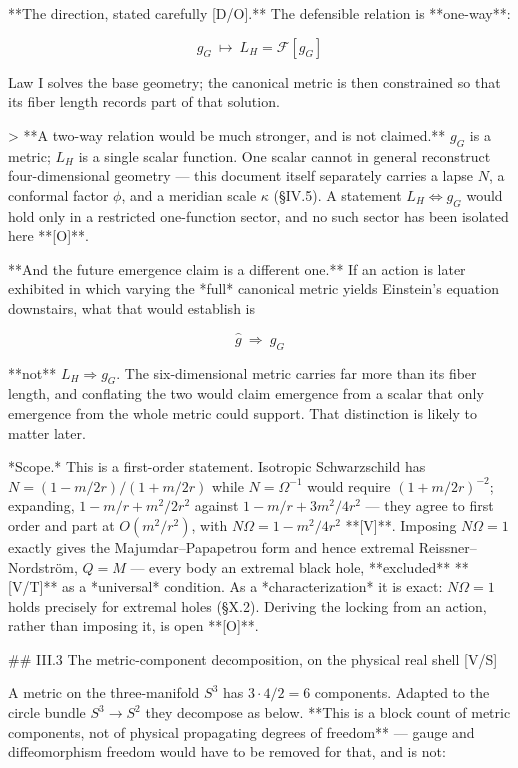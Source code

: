 **The direction, stated carefully [D/O].** The defensible relation is **one-way**:

$$g_G\ \longmapsto\ L_H = \mathcal{F}[g_G]$$

Law I solves the base geometry; the canonical metric is then constrained so that its fiber length records part of that solution.

> **A two-way relation would be much stronger, and is not claimed.** $g_G$ is a metric; $L_H$ is a single scalar function. One scalar cannot in general reconstruct four-dimensional geometry — this document itself separately carries a lapse $N$, a conformal factor $\phi$, and a meridian scale $\kappa$ (§IV.5). A statement $L_H\Leftrightarrow g_G$ would hold only in a restricted one-function sector, and no such sector has been isolated here **[O]**.

**And the future emergence claim is a different one.** If an action is later exhibited in which varying the *full* canonical metric yields Einstein's equation downstairs, what that would establish is

$$\hat g\ \Longrightarrow\ g_G$$

**not** $L_H\Rightarrow g_G$. The six-dimensional metric carries far more than its fiber length, and conflating the two would claim emergence from a scalar that only emergence from the whole metric could support. That distinction is likely to matter later.

*Scope.* This is a first-order statement. Isotropic Schwarzschild has $N = (1-m/2r)/(1+m/2r)$ while $N = \Omega^{-1}$ would require $(1+m/2r)^{-2}$; expanding, $1-m/r+m^2/2r^2$ against $1-m/r+3m^2/4r^2$ — they agree to first order and part at $O(m^2/r^2)$, with $N\Omega = 1-m^2/4r^2$ **[V]**. Imposing $N\Omega = 1$ exactly gives the Majumdar–Papapetrou form and hence extremal Reissner–Nordström, $Q = M$ — every body an extremal black hole, **excluded** **[V/T]** as a *universal* condition. As a *characterization* it is exact: $N\Omega = 1$ holds precisely for extremal holes (§X.2). Deriving the locking from an action, rather than imposing it, is open **[O]**.

## III.3 The metric-component decomposition, on the physical real shell [V/S]

A metric on the three-manifold $S^3$ has $3\cdot4/2 = 6$ components. Adapted to the circle bundle $S^3\to S^2$ they decompose as below. **This is a block count of metric components, not of physical propagating degrees of freedom** — gauge and diffeomorphism freedom would have to be removed for that, and is not:

